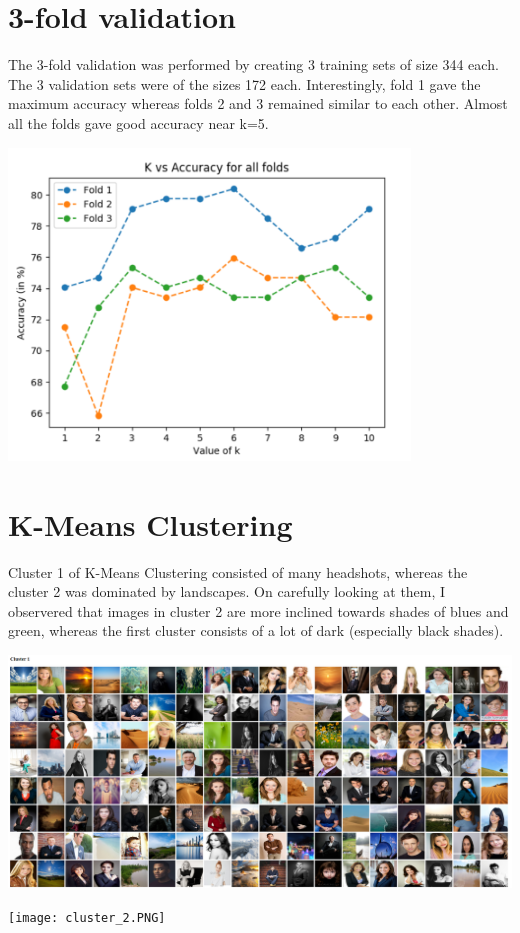 \documentclass{article}
\begin{document}
\section{3-fold validation}

The 3-fold validation was performed by creating 3 training sets of size 344 each. The 3 validation sets were of the sizes 172 each.
\newline
Interestingly, fold 1 gave the maximum accuracy whereas folds 2 and 3 remained similar to each other. Almost all the folds gave good accuracy near k=5.

{\centering\includegraphics[width=0.8\textwidth]{3_fold_graph.PNG}}
\newline

\section{K-Means Clustering}
Cluster 1 of K-Means Clustering consisted of many headshots, whereas the cluster 2 was dominated by landscapes. On carefully looking at them, I observered that images in cluster 2 are more inclined towards shades of blues and green, whereas the first cluster consists of a lot of dark (especially black shades).

{\centering\includegraphics[width=1\textwidth]{cluster_1.PNG}}

{\centering\texttt{[image: cluster\_2.PNG]}}
\end{document}

